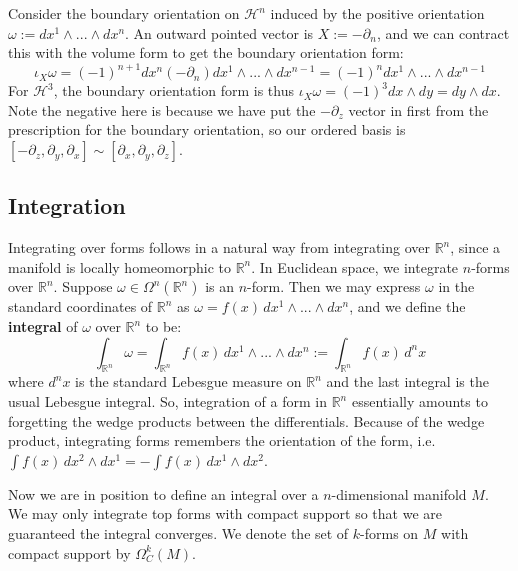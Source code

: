 \begin{example}
	Consider the boundary orientation on $\mathcal H^n$ induced by the positive orientation $\omega := dx^1\wedge ...
	\wedge dx^n$. An outward pointed vector is $X := -\partial_n$, and we can contract this with the volume form to get 
	the boundary orientation form:
	\begin{equation}
		\iota_{X}\omega = (-1)^{n + 1}dx^n(-\partial_n) dx^1\wedge ... \wedge dx^{n - 1} = (-1)^n dx^1\wedge ...\wedge 
		dx^{n - 1}
	\end{equation}
	For $\mathcal H^3$, the boundary orientation form is thus $\iota_X\omega = (-1)^3 dx\wedge dy = dy\wedge dx$. Note 
	the negative here is because we have put the $-\partial_z$ vector in first from the prescription for the boundary 
	orientation, so our ordered basis is $[-\partial_z, \partial_y, \partial_x]\sim [\partial_x, \partial_y, \partial_z]$. 
\end{example}

\subsection{Integration}

Integrating over forms follows in a natural way from integrating over $\mathbb R^n$, since a manifold is locally 
homeomorphic to $\mathbb R^n$. In Euclidean space, we integrate $n$-forms over $\mathbb R^n$. Suppose 
$\omega\in\Omega^n(\mathbb R^n)$ is an $n$-form. Then we may express $\omega$ in the standard coordinates 
of $\mathbb R^n$ as $\omega = f(x)\,dx^1\wedge ...\wedge dx^n$, and we define the \textbf{integral} of $\omega$ 
over $\mathbb R^n$ to be:
\begin{equation}
	\int_{\mathbb R^n}\omega = \int_{\mathbb R^n} f(x)\,dx^1\wedge ...\wedge dx^n := \int_{\mathbb R^n} f(x)\,d^nx
\end{equation}
where $d^nx$ is the standard Lebesgue measure on $\mathbb R^n$ and the last integral is the usual Lebesgue integral. 
So, integration of a form in $\mathbb R^n$ essentially amounts to forgetting the wedge products between the differentials. 
Because of the wedge product, integrating forms remembers the orientation of the form, i.e. $\int f(x)\,dx^2\wedge dx^1 = 
-\int f(x)\,dx^1\wedge dx^2$. 

Now we are in position to define an integral over a $n$-dimensional manifold $M$. We may only integrate top forms with 
compact support so that we are guaranteed the integral converges. We denote the set of $k$-forms on $M$ with compact 
support by $\Omega^k_C(M)$.

